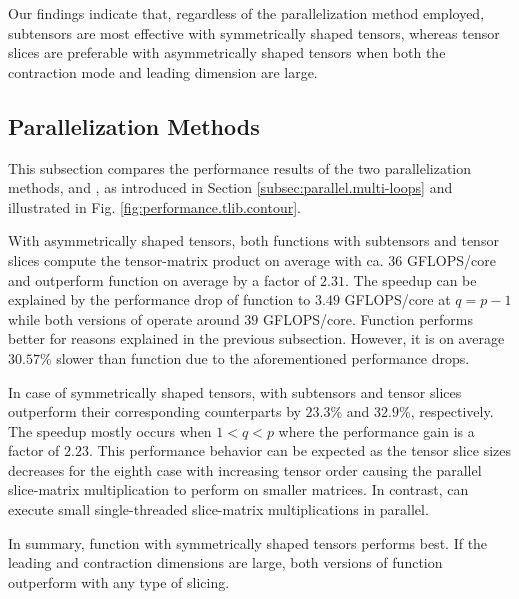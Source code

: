 Our findings indicate that, regardless of the parallelization method employed, subtensors are most effective with symmetrically shaped tensors, whereas tensor slices are preferable with asymmetrically shaped tensors when both the contraction mode and leading dimension are large.



\subsection{Parallelization Methods}
\label{subsec:results.parallelization-methods}
This subsection compares the performance results of the two parallelization methods,  and , as introduced in Section \ref{subsec:parallel.multi-loops} and illustrated in Fig. \ref{fig:performance.tlib.contour}.

With asymmetrically shaped tensors, both  functions with subtensors and tensor slices compute the tensor-matrix product on average with ca. $36$ GFLOPS/core and outperform function  on average by a factor of $2.31$.
The speedup can be explained by the performance drop of function  to $3.49$ GFLOPS/core at $q=p-1$ while both versions of  operate around $39$ GFLOPS/core.
Function  performs better for reasons explained in the previous subsection.
However, it is on average $30.57$\% slower than function  due to the aforementioned performance drops.

In case of symmetrically shaped tensors,  with subtensors and tensor slices outperform their corresponding  counterparts by $23.3$\% and $32.9$\%, respectively.
The speedup mostly occurs when $1<q<p$ where the performance gain is a factor of $2.23$.
This performance behavior can be expected as the tensor slice sizes decreases for the eighth case with increasing tensor order causing the parallel slice-matrix multiplication to perform on smaller matrices.
In contrast,  can execute small single-threaded slice-matrix multiplications in parallel.

In summary, function  with symmetrically shaped tensors performs best.
If the leading and contraction dimensions are large, both versions of function  outperform  with any type of slicing. 


